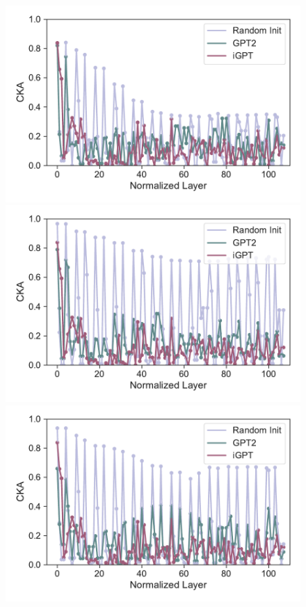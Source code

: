 \documentclass{article}
\begin{document}
\begin{figure}[H]
    \centering
    \begin{minipage}[b]{0.32\linewidth}
        \includegraphics[width=\linewidth]{figs/cka_plot_40_gpt2_igpt_dt_hopper_medium_666_action.pdf}
    \end{minipage}
    \begin{minipage}[b]{0.32\linewidth}
        \includegraphics[width=\linewidth]{figs/cka_plot_40_gpt2_igpt_dt_halfcheetah_medium_666_action.pdf}
    \end{minipage}
    \begin{minipage}[b]{0.32\linewidth}
        \includegraphics[width=\linewidth]{figs/cka_plot_40_gpt2_igpt_dt_walker2d_medium_666_action.pdf}

\end{minipage}
\end{figure}
\end{document}
